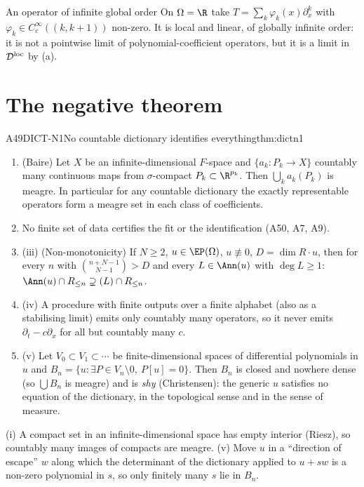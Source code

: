 \begin{example}{An operator of infinite global order}
On $\Omega=\R$ take $T=\sum_k\varphi_k(x)\partial_x^k$ with $\varphi_k\in C_c^\infty((k,k+1))$ non-zero. It is local and linear, of globally infinite order: it is not a pointwise limit of polynomial-coefficient operators, but it is a limit in $\mathcal D^{\rm loc}$ by (a).
\end{example}

\section{The negative theorem}

\begin{dimcard}{A49}{DICT-N1}{No countable dictionary identifies everything}{\proved}{thm:dictn1}
\begin{enumerate}[label=(\roman*)]
\item (Baire) Let $X$ be an infinite-dimensional $F$-space and $\{a_k:P_k\to X\}$ countably many continuous maps from $\sigma$-compact $P_k\subset\R^{p_k}$. Then $\bigcup_ka_k(P_k)$ is meagre. In particular for any countable dictionary the exactly representable operators form a meagre set in each class of coefficients.
\item No finite set of data certifies the fit or the identification (A50, A7, A9).
\item (iii) (Non-monotonicity) If $N\ge2$, $u\in\EP(\Omega)$, $u\not\equiv0$, $D=\dim R\cdot u$, then for every $n$ with $\binom{n+N-1}{N-1}>D$ and every $L\in\Ann(u)$ with $\deg L\ge1$: $\Ann(u)\cap R_{\le n}\supsetneq(L)\cap R_{\le n}$.
\item (iv) A procedure with finite outputs over a finite alphabet (also as a stabilising limit) emits only countably many operators, so it never emits $\partial_t-c\partial_x$ for all but countably many $c$.
\item (v) Let $V_0\subset V_1\subset\cdots$ be finite-dimensional spaces of differential polynomials in $u$ and $B_n=\{u:\exists P\in V_n\setminus0,\ P[u]=0\}$. Then $B_n$ is closed and nowhere dense (so $\bigcup B_n$ is meagre) and is \emph{shy} (Christensen): the generic $u$ satisfies no equation of the dictionary, in the topological sense and in the sense of measure.
\end{enumerate}
\end{dimcard}

\begin{proofidea}
(i) A compact set in an infinite-dimensional space has empty interior (Riesz), so countably many images of compacts are meagre. (v) Move $u$ in a ``direction of escape'' $w$ along which the determinant of the dictionary applied to $u+sw$ is a non-zero polynomial in $s$, so only finitely many $s$ lie in $B_n$.
\end{proofidea}

